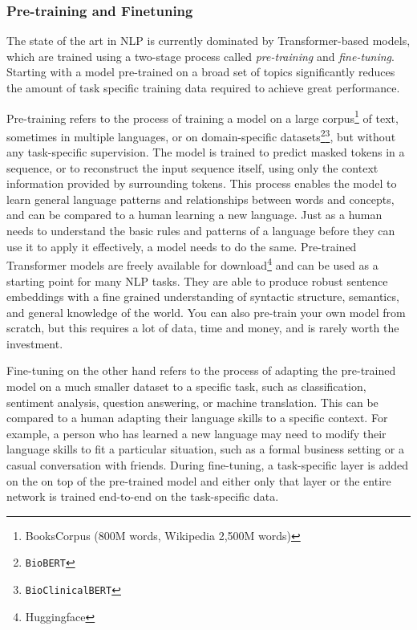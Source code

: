 \subsubsection{Pre-training and Finetuning}
The state of the art in NLP is currently dominated by Transformer-based models, which are trained using a two-stage process called \textit{pre-training} and \textit{fine-tuning}. Starting with a model pre-trained on a broad set of topics significantly reduces the amount of task specific training data required to achieve great performance.

Pre-training refers to the process of training a model on a large corpus\footnote{BooksCorpus (800M words, Wikipedia 2,500M words)}\cite{bertpaper} of text, sometimes in multiple languages, or on domain-specific datasets\footnote{\texttt{BioBERT\cite{DBLP:journals/corr/abs-1901-08746}}}\footnote{\texttt{Bio\textunderscore ClinicalBERT\cite{clinicalbert}}}, but without any task-specific supervision.
The model is trained to predict masked tokens in a sequence, or to reconstruct the input sequence itself, using only the context information provided by surrounding tokens.
This process enables the model to learn general language patterns and relationships between words and concepts, and can be compared to a human learning a new language.
Just as a human needs to understand the basic rules and patterns of a language before they can use it to apply it effectively, a model needs to do the same.
Pre-trained Transformer models are freely available for download\footnote{Huggingface} and can be used as a starting point for many NLP tasks.
They are able to produce robust sentence embeddings with a fine grained understanding of syntactic structure, semantics, and general knowledge of the world.
You can also pre-train your own model from scratch, but this requires a lot of data, time and money, and is rarely worth the investment.

Fine-tuning on the other hand refers to the process of adapting the pre-trained model on a much smaller dataset to a specific task, such as classification, sentiment analysis, question answering, or machine translation.
This can be compared to a human adapting their language skills to a specific context.
For example, a person who has learned a new language may need to modify their language skills to fit a particular situation, such as a formal business setting or a casual conversation with friends.
During fine-tuning, a task-specific layer is added on the on top of the pre-trained model and either only that layer or the entire network is trained end-to-end on the task-specific data.

